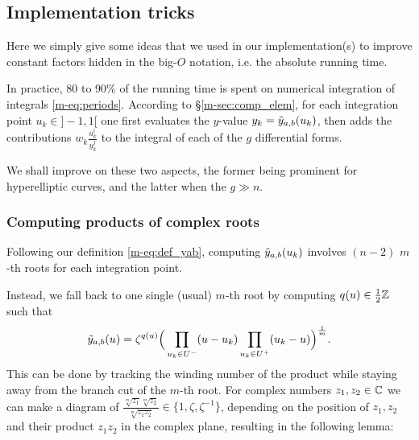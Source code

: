 \documentclass[main.tex]{subfiles}
\begin{document}
   \subsection{Implementation tricks}

   Here we simply give some ideas that we used in our implementation(s) to improve constant factors hidden in the big-$O$ notation, i.e. the absolute running time.

   In practice, 80 to 90\% of the running time is spent on numerical integration
   of integrals \eqref{m-eq:periods}. According to \S\ref{m-sec:comp_elem},
   for each integration point $u_k\in]-1,1[$ one first evaluates the $y$-value
   $y_k=\tilde{y}_{a,b}(u_k)$, then adds the contributions $w_k\frac{u_k^i}{y_k^j}$ to
   the integral of each of the $g$ differential forms.

   We shall improve on these two aspects, the former being prominent for hyperelliptic curves,
   and the latter when the $g \gg n$.

    \subsubsection{Computing products of complex roots}\label{subsec:computing_roots}

    Following our definition \eqref{m-eq:def_yab}, computing $\tilde{y}_{a,b}(u_k)$ involves
    $(n-2)$ $m$-th roots for each integration point.

    Instead, we fall back to one single (usual) $m$-th root
    by computing $q(u)\in\frac12\mathbb{Z}$ such that
  \begin{equation}
      \label{eq:ytab_comp}
      \tilde{y}_{a,b}(u) = \zeta^{q(u)} \Big( \prod_{u_k\in U^-}(u-u_k) \prod_{u_k\in U^+} (u_k-u) \Big)^{\frac{1}{m}}.
  \end{equation}
  This can be done by tracking
  the winding number of the product while staying away from the branch cut
  of the $m$-th root.
  For complex numbers $z_1,z_2 \in \mathbb{C}$ we can make a diagram of
  $\frac{\sqrt[m]{z_1}\sqrt[m]{z_2}}{\sqrt[m]{z_1z_2}} \in \{ 1, \zeta,
  \zeta^{-1} \}$, depending on the position of $z_1,z_2$ and their product
  $z_1z_2$ in the complex plane, resulting in the following lemma:
\end{document}
